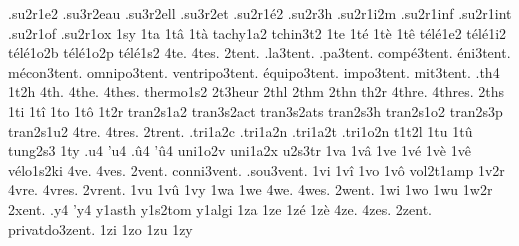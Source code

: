 {                    .su2r1e2
                    .su3r2eau
                    .su3r2ell
                    .su3r2et
                    .su2r1é2
                    .su2r3h
                    .su2r1i2m
                    .su2r1inf
                    .su2r1int
                    .su2r1of
                    .su2r1ox
1sy
1ta
1tâ
1tà
                    tachy1a2
                    tchin3t2
1te
1té
1tè
1tê
                    télé1e2
                    télé1i2
                    télé1o2b
                    télé1o2p
                    télé1s2
4te.
4tes.
        2tent. %
     .la3tent.
     .pa3tent.
   compé3tent.
     éni3tent.
   mécon3tent.
  omnipo3tent.
ventripo3tent.
  équipo3tent.
    impo3tent.
     mit3tent.
%
.th4
1t2h
4th.
4the.
4thes.
                    thermo1s2
                    2t3heur
2thl %
2thm
2thn
th2r
4thre.
4thres.
2ths
1ti
1tî
1to
1tô
1t2r
                    tran2s1a2
                    tran3s2act
                    tran3s2ats
                    tran2s3h
                    tran2s1o2
                    tran2s3p
                    tran2s1u2
4tre.
4tres.
2trent. %
                    .tri1a2c
                    .tri1a2n
                    .tri1a2t
                    .tri1o2n
                    t1t2l
1tu
1tû
tung2s3
1ty
.u4
'u4
.û4
'û4
                    uni1o2v
                    uni1a2x
                    u2s3tr
1va
1vâ
1ve
1vé
1vè
1vê
                    vélo1s2ki
4ve.
4ves.
     2vent.
conni3vent.
 .sou3vent.
%
1vi
1vî
1vo
1vô
                    vol2t1amp
1v2r
4vre.
4vres.
2vrent. %
1vu
1vû
1vy
1wa
1we
4we.
4wes.
2went. %
1wi
1wo
1wu
1w2r
2xent. %
.y4
'y4
                    y1asth
                    y1s2tom
                    y1algi
1za
1ze
1zé
1zè
4ze.
4zes.
        2zent.
privatdo3zent.
%
1zi
1zo
1zu
1zy
}

